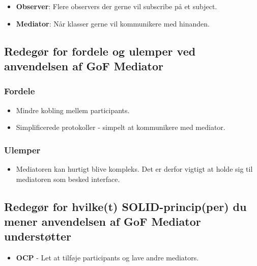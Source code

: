 \begin{itemize}
	\item \textbf{Observer}: Flere observers der gerne vil subscribe på et subject.
	\item \textbf{Mediator}: Når klasser gerne vil kommunikere med hinanden.
\end{itemize}

\subsection{Redegør for fordele og ulemper ved anvendelsen af GoF Mediator}

\subsubsection{Fordele}
\begin{itemize}
	\item Mindre kobling mellem participants.
	\item Simplificerede protokoller - simpelt at kommunikere med mediator.
\end{itemize}

\subsubsection{Ulemper}
\begin{itemize}
	\item Mediatoren kan hurtigt blive kompleks. Det er derfor vigtigt at holde sig til mediatoren som besked interface.
\end{itemize}

\subsection{Redegør for hvilke(t) SOLID-princip(per) du mener anvendelsen af GoF Mediator understøtter}

\begin{itemize}
	\item \textbf{OCP} - Let at tilføje participants og lave andre mediators.
\end{itemize}
